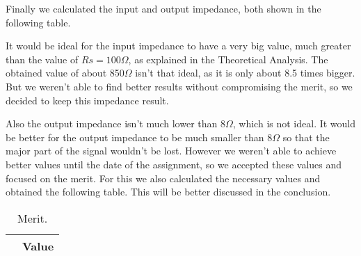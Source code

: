 Finally we calculated the input and output impedance, both shown in the following table.

\FloatBarrier
\begin{table}[h]
	\centering
	\qquad
	\caption{Input and Output Impedance}
	\label{tab:sim6}
\end{table}
\FloatBarrier 

It would be ideal for the input impedance to have a very big value, much greater than the value of $Rs=100\Omega$, as explained in the Theoretical Analysis. The obtained value of about 850$\Omega$ isn't that ideal, as it is only about 8.5 times bigger. But we weren't able to find better results without compromising the merit, so we decided to keep this impedance result.

Also the output impedance isn't much lower than 8$\Omega$, which is not ideal. It would be better for the output impedance to be much smaller than 8$\Omega$ so that the major part of the signal wouldn't be lost. However we weren't able to achieve better values until the date of the assignment, so we accepted these values and focused on the merit. For this we also calculated the necessary values and obtained the following table. This will be better discussed in the conclusion.

\FloatBarrier
\begin{table}[ht]
	\centering
	\begin{tabular}{|c|c|}
		\hline    
		  & {\bf Value} \\ \hline
				
	\end{tabular}
	\caption{Merit.}
	\label{tab:ngspice7}
\end{table}
\FloatBarrier